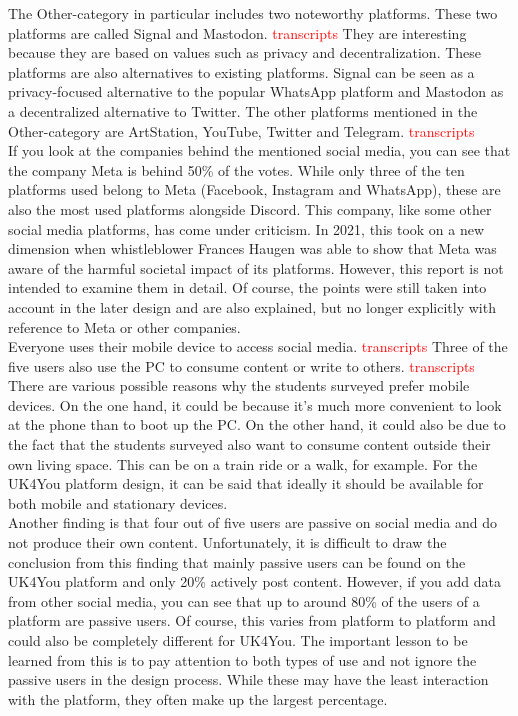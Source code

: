 The Other-category in particular includes two noteworthy platforms.
These two platforms are called Signal and Mastodon\cite{signal}\cite{mastodon}. \textcolor{red}{transcripts}
They are interesting because they are based on values such as privacy and decentralization.
These platforms are also alternatives to existing platforms.
Signal can be seen as a privacy-focused alternative to the popular WhatsApp platform and Mastodon as a decentralized alternative to Twitter.
The other platforms mentioned in the Other-category are ArtStation, YouTube, Twitter and Telegram. \textcolor{red}{transcripts}\\

If you look at the companies behind the mentioned social media, you can see that the company Meta is behind 50\% of the votes.
While only three of the ten platforms used belong to Meta (Facebook, Instagram and WhatsApp), these are also the most used platforms alongside Discord.
This company, like some other social media platforms, has come under criticism.
In 2021, this took on a new dimension when whistleblower Frances Haugen was able to show that Meta was aware of the harmful societal impact of its platforms\cite{whistleblower-meta}.
However, this report is not intended to examine them in detail.
Of course, the points were still taken into account in the later design and are also explained, but no longer explicitly with reference to Meta or other companies.\\

Everyone uses their mobile device to access social media. \textcolor{red}{transcripts}
Three of the five users also use the PC to consume content or write to others. \textcolor{red}{transcripts}
There are various possible reasons why the students surveyed prefer mobile devices.
On the one hand, it could be because it's much more convenient to look at the phone than to boot up the PC.
On the other hand, it could also be due to the fact that the students surveyed also want to consume content outside their own living space.
This can be on a train ride or a walk, for example.
For the UK4You platform design, it can be said that ideally it should be available for both mobile and stationary devices.\\

Another finding is that four out of five users are passive on social media and do not produce their own content.
Unfortunately, it is difficult to draw the conclusion from this finding that mainly passive users can be found on the UK4You platform and only 20\% actively post content.
However, if you add data from other social media, you can see that up to around 80\% of the users of a platform are passive users.
Of course, this varies from platform to platform and could also be completely different for UK4You.
The important lesson to be learned from this is to pay attention to both types of use and not ignore the passive users in the design process.
While these may have the least interaction with the platform, they often make up the largest percentage.\\



